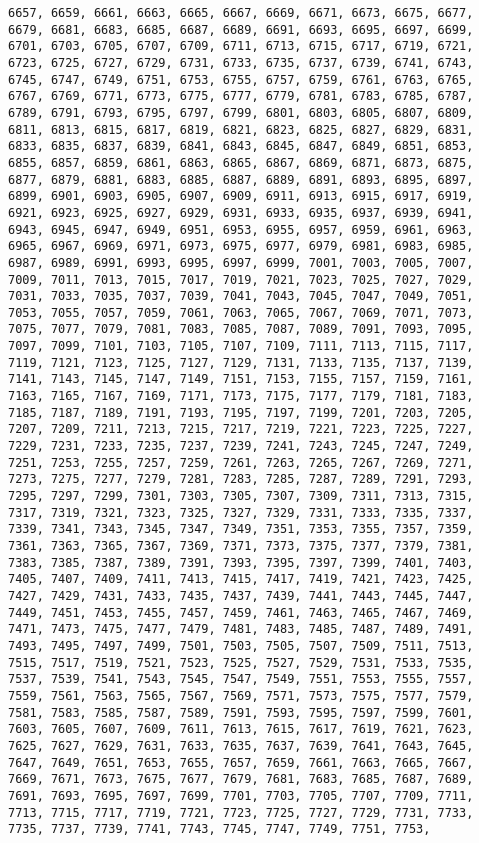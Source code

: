 \documentclass[11pt]{article}
\begin{document}
\begin{Verbatim}[commandchars=\\\{\}]
6657, 6659, 6661, 6663, 6665, 6667, 6669, 6671, 6673, 6675, 6677, 6679, 6681, 6683, 6685, 6687, 6689, 6691, 6693, 6695, 6697, 6699, 6701, 6703, 6705, 6707, 6709, 6711, 6713, 6715, 6717, 6719, 6721, 6723, 6725, 6727, 6729, 6731, 6733, 6735, 6737, 6739, 6741, 6743, 6745, 6747, 6749, 6751, 6753, 6755, 6757, 6759, 6761, 6763, 6765, 6767, 6769, 6771, 6773, 6775, 6777, 6779, 6781, 6783, 6785, 6787, 6789, 6791, 6793, 6795, 6797, 6799, 6801, 6803, 6805, 6807, 6809, 6811, 6813, 6815, 6817, 6819, 6821, 6823, 6825, 6827, 6829, 6831, 6833, 6835, 6837, 6839, 6841, 6843, 6845, 6847, 6849, 6851, 6853, 6855, 6857, 6859, 6861, 6863, 6865, 6867, 6869, 6871, 6873, 6875, 6877, 6879, 6881, 6883, 6885, 6887, 6889, 6891, 6893, 6895, 6897, 6899, 6901, 6903, 6905, 6907, 6909, 6911, 6913, 6915, 6917, 6919, 6921, 6923, 6925, 6927, 6929, 6931, 6933, 6935, 6937, 6939, 6941, 6943, 6945, 6947, 6949, 6951, 6953, 6955, 6957, 6959, 6961, 6963, 6965, 6967, 6969, 6971, 6973, 6975, 6977, 6979, 6981, 6983, 6985, 6987, 6989, 6991, 6993, 6995, 6997, 6999, 7001, 7003, 7005, 7007, 7009, 7011, 7013, 7015, 7017, 7019, 7021, 7023, 7025, 7027, 7029, 7031, 7033, 7035, 7037, 7039, 7041, 7043, 7045, 7047, 7049, 7051, 7053, 7055, 7057, 7059, 7061, 7063, 7065, 7067, 7069, 7071, 7073, 7075, 7077, 7079, 7081, 7083, 7085, 7087, 7089, 7091, 7093, 7095, 7097, 7099, 7101, 7103, 7105, 7107, 7109, 7111, 7113, 7115, 7117, 7119, 7121, 7123, 7125, 7127, 7129, 7131, 7133, 7135, 7137, 7139, 7141, 7143, 7145, 7147, 7149, 7151, 7153, 7155, 7157, 7159, 7161, 7163, 7165, 7167, 7169, 7171, 7173, 7175, 7177, 7179, 7181, 7183, 7185, 7187, 7189, 7191, 7193, 7195, 7197, 7199, 7201, 7203, 7205, 7207, 7209, 7211, 7213, 7215, 7217, 7219, 7221, 7223, 7225, 7227, 7229, 7231, 7233, 7235, 7237, 7239, 7241, 7243, 7245, 7247, 7249, 7251, 7253, 7255, 7257, 7259, 7261, 7263, 7265, 7267, 7269, 7271, 7273, 7275, 7277, 7279, 7281, 7283, 7285, 7287, 7289, 7291, 7293, 7295, 7297, 7299, 7301, 7303, 7305, 7307, 7309, 7311, 7313, 7315, 7317, 7319, 7321, 7323, 7325, 7327, 7329, 7331, 7333, 7335, 7337, 7339, 7341, 7343, 7345, 7347, 7349, 7351, 7353, 7355, 7357, 7359, 7361, 7363, 7365, 7367, 7369, 7371, 7373, 7375, 7377, 7379, 7381, 7383, 7385, 7387, 7389, 7391, 7393, 7395, 7397, 7399, 7401, 7403, 7405, 7407, 7409, 7411, 7413, 7415, 7417, 7419, 7421, 7423, 7425, 7427, 7429, 7431, 7433, 7435, 7437, 7439, 7441, 7443, 7445, 7447, 7449, 7451, 7453, 7455, 7457, 7459, 7461, 7463, 7465, 7467, 7469, 7471, 7473, 7475, 7477, 7479, 7481, 7483, 7485, 7487, 7489, 7491, 7493, 7495, 7497, 7499, 7501, 7503, 7505, 7507, 7509, 7511, 7513, 7515, 7517, 7519, 7521, 7523, 7525, 7527, 7529, 7531, 7533, 7535, 7537, 7539, 7541, 7543, 7545, 7547, 7549, 7551, 7553, 7555, 7557, 7559, 7561, 7563, 7565, 7567, 7569, 7571, 7573, 7575, 7577, 7579, 7581, 7583, 7585, 7587, 7589, 7591, 7593, 7595, 7597, 7599, 7601, 7603, 7605, 7607, 7609, 7611, 7613, 7615, 7617, 7619, 7621, 7623, 7625, 7627, 7629, 7631, 7633, 7635, 7637, 7639, 7641, 7643, 7645, 7647, 7649, 7651, 7653, 7655, 7657, 7659, 7661, 7663, 7665, 7667, 7669, 7671, 7673, 7675, 7677, 7679, 7681, 7683, 7685, 7687, 7689, 7691, 7693, 7695, 7697, 7699, 7701, 7703, 7705, 7707, 7709, 7711, 7713, 7715, 7717, 7719, 7721, 7723, 7725, 7727, 7729, 7731, 7733, 7735, 7737, 7739, 7741, 7743, 7745, 7747, 7749, 7751, 7753, 
\end{Verbatim}
\end{document}
